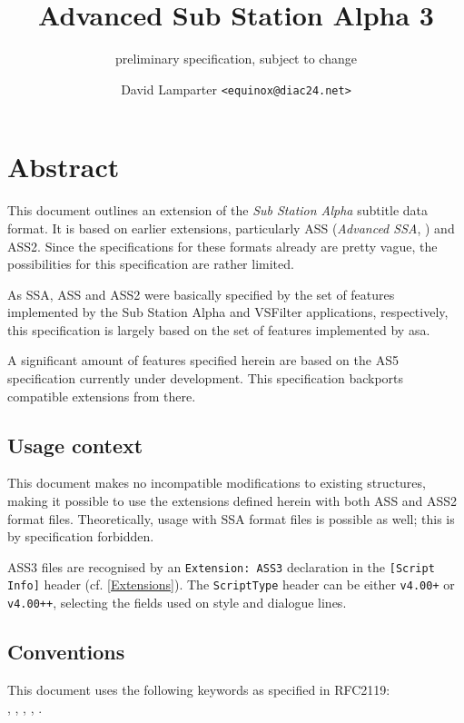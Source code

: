 \documentclass{spec}
\begin{document}
\title{Advanced Sub Station Alpha 3}
\subtitle{{\color{prelim}preliminary specification, subject to change}}
\author{David Lamparter \texttt{<equinox@diac24.net>}}
\spectitle

\section{Abstract}
This document outlines an extension of the \emph{Sub Station Alpha}\cite{SSA}
subtitle data format. It is based on earlier extensions, particularly
ASS (\emph{Advanced SSA}, \cite{ASS}) and ASS2\cite{ASS2}. Since the
specifications for these formats already are pretty vague, the possibilities
for this specification are rather limited.

As SSA, ASS and ASS2 were basically specified by the set of features
implemented by the Sub Station Alpha and VSFilter\cite{VSFilter} applications,
respectively, this specification is largely based on the set of features
implemented by asa\cite{asa}.

A significant amount of features specified herein are based on the
AS5\cite{AS5} specification currently under development. This specification
backports compatible extensions from there.

\subsection{Usage context}
This document makes no incompatible modifications to existing structures,
making it possible to use the extensions defined herein with both ASS and
ASS2 format files. Theoretically, usage with SSA format files is possible
as well; this is by specification forbidden.

ASS3 files are recognised by an \texttt{Extension:~ASS3} declaration in the
\texttt{[Script Info]} header (cf. \ref{Extensions}). The \texttt{ScriptType}
header can be either \texttt{v4.00+} or \texttt{v4.00++}, selecting the
fields used on style and dialogue lines.

\subsection{Conventions}
This document uses the following keywords as specified in RFC2119\cite{2119}:\\
\may, \should, \shouldnot, \must, \mustnot.
\end{document}

